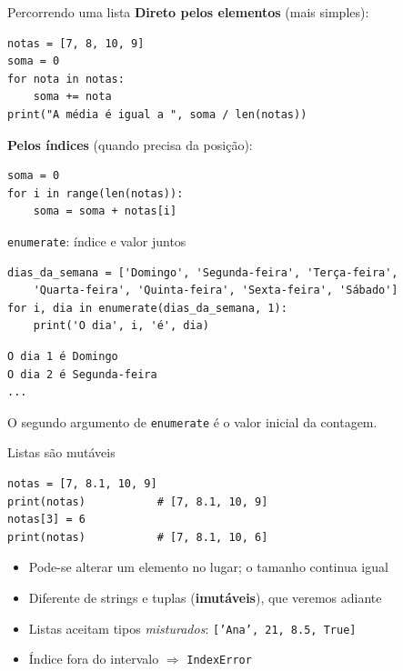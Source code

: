 \documentclass[aspectratio=169,10pt,t]{beamer}
\begin{document}
\begin{frame}[fragile]{Percorrendo uma lista}
  \textbf{Direto pelos elementos} (mais simples):
\begin{lstlisting}
notas = [7, 8, 10, 9]
soma = 0
for nota in notas:
    soma += nota
print("A média é igual a ", soma / len(notas))
\end{lstlisting}
  \textbf{Pelos índices} (quando precisa da posição):
\begin{lstlisting}
soma = 0
for i in range(len(notas)):
    soma = soma + notas[i]
\end{lstlisting}
\end{frame}

\begin{frame}[fragile]{\texttt{enumerate}: índice e valor juntos}
\begin{lstlisting}
dias_da_semana = ['Domingo', 'Segunda-feira', 'Terça-feira',
    'Quarta-feira', 'Quinta-feira', 'Sexta-feira', 'Sábado']
for i, dia in enumerate(dias_da_semana, 1):
    print('O dia', i, 'é', dia)
\end{lstlisting}
\begin{lstlisting}[style=saida]
O dia 1 é Domingo
O dia 2 é Segunda-feira
...
\end{lstlisting}
  \small O segundo argumento de \texttt{enumerate} é o valor inicial da contagem.\\
\end{frame}

\begin{frame}[fragile]{Listas são mutáveis}
\begin{lstlisting}
notas = [7, 8.1, 10, 9]
print(notas)           # [7, 8.1, 10, 9]
notas[3] = 6
print(notas)           # [7, 8.1, 10, 6]
\end{lstlisting}
  \begin{itemize}
    \item Pode-se \alert{alterar} um elemento no lugar; o tamanho continua igual
    \item Diferente de strings e tuplas (\textbf{imutáveis}), que veremos adiante
    \item Listas aceitam tipos \emph{misturados}: \texttt{['Ana', 21, 8.5, True]}
    \item Índice fora do intervalo \(\Rightarrow\) \texttt{IndexError}
  \end{itemize}
\end{frame}
\end{document}
